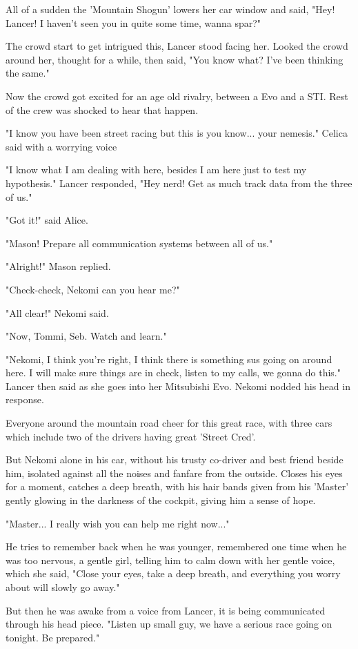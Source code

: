All of a sudden the 'Mountain Shogun' lowers her car window and said, "Hey! Lancer! I haven't seen you in quite some time, wanna spar?"

The crowd start to get intrigued this, Lancer stood facing her. Looked the crowd around her, thought for a while, then said, "You know what? I've been thinking the same."

Now the crowd got excited for an age old rivalry, between a Evo and a STI. Rest of the crew was shocked to hear that happen.

"I know you have been street racing but this is you know... your nemesis." Celica said with a worrying voice

"I know what I am dealing with here, besides I am here just to test my hypothesis." Lancer responded, "Hey nerd! Get as much track data from the three of us."

"Got it!" said Alice.

"Mason! Prepare all communication systems between all of us."

"Alright!" Mason replied.

"Check-check, Nekomi can you hear me?"

"All clear!" Nekomi said.

"Now, Tommi, Seb. Watch and learn."

"Nekomi, I think you're right, I think there is something sus going on around here. I will make sure things are in check, listen to my calls, we gonna do this." Lancer then said as she goes into her Mitsubishi Evo. Nekomi nodded his head in response.

Everyone around the mountain road cheer for this great race, with three cars which include two of the drivers having great 'Street Cred'.

But Nekomi alone in his car, without his trusty co-driver and best friend beside him, isolated against all the noises and fanfare from the outside. Closes his eyes for a moment, catches a deep breath, with his hair bands given from his 'Master' gently glowing in the darkness of the cockpit, giving him a sense of hope. 

"Master... I really wish you can help me right now..."

He tries to remember back when he was younger, remembered one time when he was too nervous, a gentle girl, telling him to calm down with her gentle voice, which she said, "Close your eyes, take a deep breath, and everything you worry about will slowly go away."

But then he was awake from a voice from Lancer, it is being communicated through his head piece. "Listen up small guy, we have a serious race going on tonight. Be prepared."

